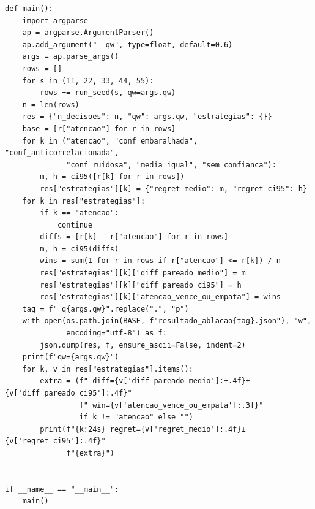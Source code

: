 \documentclass[12pt,openany,oneside,a4paper,brazil,chapter=TITLE]{abntex2}
\begin{document}
\begin{lstlisting}
def main():
    import argparse
    ap = argparse.ArgumentParser()
    ap.add_argument("--qw", type=float, default=0.6)
    args = ap.parse_args()
    rows = []
    for s in (11, 22, 33, 44, 55):
        rows += run_seed(s, qw=args.qw)
    n = len(rows)
    res = {"n_decisoes": n, "qw": args.qw, "estrategias": {}}
    base = [r["atencao"] for r in rows]
    for k in ("atencao", "conf_embaralhada", "conf_anticorrelacionada",
              "conf_ruidosa", "media_igual", "sem_confianca"):
        m, h = ci95([r[k] for r in rows])
        res["estrategias"][k] = {"regret_medio": m, "regret_ci95": h}
    for k in res["estrategias"]:
        if k == "atencao":
            continue
        diffs = [r[k] - r["atencao"] for r in rows]
        m, h = ci95(diffs)
        wins = sum(1 for r in rows if r["atencao"] <= r[k]) / n
        res["estrategias"][k]["diff_pareado_medio"] = m
        res["estrategias"][k]["diff_pareado_ci95"] = h
        res["estrategias"][k]["atencao_vence_ou_empata"] = wins
    tag = f"_q{args.qw}".replace(".", "p")
    with open(os.path.join(BASE, f"resultado_ablacao{tag}.json"), "w",
              encoding="utf-8") as f:
        json.dump(res, f, ensure_ascii=False, indent=2)
    print(f"qw={args.qw}")
    for k, v in res["estrategias"].items():
        extra = (f" diff={v['diff_pareado_medio']:+.4f}±{v['diff_pareado_ci95']:.4f}"
                 f" win={v['atencao_vence_ou_empata']:.3f}"
                 if k != "atencao" else "")
        print(f"{k:24s} regret={v['regret_medio']:.4f}±{v['regret_ci95']:.4f}"
              f"{extra}")


if __name__ == "__main__":
    main()
\end{lstlisting}
\end{document}
